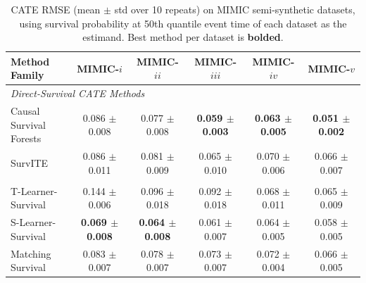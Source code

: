 \documentclass{article} %
\begin{document}
\begin{table}[!ht]
\centering
\footnotesize
\setlength{\tabcolsep}{4pt}
\caption{CATE RMSE (mean $\pm$ std over 10 repeats) on MIMIC semi-synthetic datasets, using survival probability at 50th quantile event time of each dataset as the estimand. Best method per dataset is \textbf{bolded}.}
\label{tab:cate_rmse_prob50}
        \begin{subtable}{\linewidth}
        \centering
        \begin{tabular}{lccccc}
        \toprule
        \textbf{Method Family} & \textbf{MIMIC-$i$} & \textbf{MIMIC-$ii$} & \textbf{MIMIC-$iii$} & \textbf{MIMIC-$iv$} & \textbf{MIMIC-$v$} \\
        \midrule
        \multicolumn{6}{l}{\textit{Direct-Survival CATE Methods}} \\
                Causal Survival Forests & 0.086 $\pm$ 0.008 & 0.077 $\pm$ 0.008 & \textbf{0.059 $\pm$ 0.003} & \textbf{0.063 $\pm$ 0.005} & \textbf{0.051 $\pm$ 0.002} \\ 
                SurvITE & 0.086 $\pm$ 0.011 & 0.081 $\pm$ 0.009 & 0.065 $\pm$ 0.010 & 0.070 $\pm$ 0.006 & 0.066 $\pm$ 0.007 \\ 
        \addlinespace
        \multicolumn{6}{l}{\textit{Survival Meta-Learners}} \\
                T-Learner-Survival & 0.144 $\pm$ 0.006 & 0.096 $\pm$ 0.018 & 0.092 $\pm$ 0.018 & 0.068 $\pm$ 0.011 & 0.065 $\pm$ 0.009 \\ 
                S-Learner-Survival & \textbf{0.069 $\pm$ 0.008} & \textbf{0.064 $\pm$ 0.008} & 0.061 $\pm$ 0.007 & 0.064 $\pm$ 0.005 & 0.058 $\pm$ 0.005 \\ 
                Matching Survival & 0.083 $\pm$ 0.007 & 0.078 $\pm$ 0.007 & 0.073 $\pm$ 0.007 & 0.072 $\pm$ 0.004 & 0.066 $\pm$ 0.005 \\ 
        \bottomrule
        \end{tabular}
        \end{subtable}

        \vspace{0.6em}


\end{table}
\end{document}
